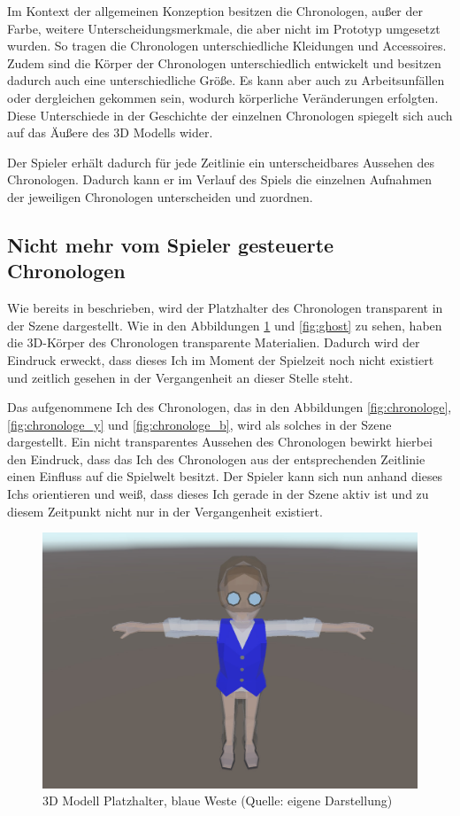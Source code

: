 Im Kontext der allgemeinen Konzeption besitzen die Chronologen, außer der Farbe, weitere Unterscheidungsmerkmale, die aber nicht im Prototyp umgesetzt wurden. So tragen die Chronologen unterschiedliche Kleidungen und Accessoires. Zudem sind die Körper der Chronologen unterschiedlich entwickelt und besitzen dadurch auch eine unterschiedliche Größe. Es kann aber auch zu Arbeitsunfällen oder dergleichen gekommen sein, wodurch körperliche Veränderungen erfolgten. Diese Unterschiede in der Geschichte der einzelnen Chronologen spiegelt sich auch auf das Äußere des \ac{3D} Modells wider. 

Der Spieler erhält dadurch für jede Zeitlinie ein unterscheidbares Aussehen des Chronologen. Dadurch kann er im Verlauf des Spiels die einzelnen Aufnahmen der jeweiligen Chronologen unterscheiden und zuordnen.

\subsection{Nicht mehr vom Spieler gesteuerte Chronologen}
Wie bereits in  beschrieben, wird der Platzhalter des Chronologen transparent in der Szene dargestellt. Wie in den Abbildungen \ref{fig:ghost_b} und \ref{fig:ghost} zu sehen, haben die \ac{3D}-Körper des Chronologen transparente Materialien. Dadurch wird der Eindruck erweckt, dass dieses Ich im Moment der Spielzeit noch nicht existiert und zeitlich gesehen in der Vergangenheit an dieser Stelle steht.

Das aufgenommene Ich des Chronologen, das in den Abbildungen \ref{fig:chronologe}, \ref{fig:chronologe_y} und \ref{fig:chronologe_b}, wird als solches in der Szene dargestellt. Ein nicht transparentes Aussehen des Chronologen bewirkt hierbei den Eindruck, dass das Ich des Chronologen aus der entsprechenden Zeitlinie einen Einfluss auf die Spielwelt besitzt. Der Spieler kann sich nun anhand dieses Ichs orientieren und weiß, dass dieses Ich gerade in der Szene aktiv ist und zu diesem Zeitpunkt nicht nur in der Vergangenheit existiert.
\begin{figure}[ht]
\centering
\includegraphics[width=0.8\linewidth]{content/pictures/Ghost_b.jpg}
\caption{3D Modell Platzhalter, blaue Weste (Quelle: eigene Darstellung)}
\label{fig:ghost_b}
\end{figure}

